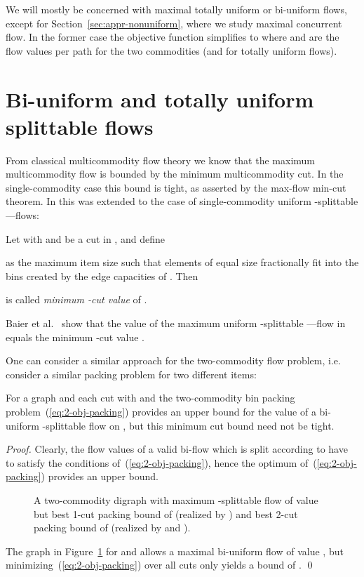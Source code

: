 We will mostly be concerned with maximal totally uniform or bi-uniform
flows, except for Section~\ref{sec:appr-nonuniform}, where we study
maximal concurrent flow. In the former case the objective function
simplifies to  where  and  are the flow
values per path for the two commodities (and  for totally uniform
flows).

\section{Bi-uniform and totally uniform splittable flows}
\label{sec:totally-uniform}

From classical multicommodity flow theory we know that the maximum
multicommodity flow is bounded by the minimum multicommodity cut. In
the single-commodity case this bound is tight, as asserted by the
max-flow min-cut theorem. In \cite{baier-koehler-skutella:05} this was
extended to the case of single-commodity uniform -splittable
---flows:
\begin{definition}
  Let  with  and  be a cut in
  , and define 
  
  as the maximum item size such that  elements of equal size fractionally 
  fit into the bins created by the edge capacities of .
  Then
  
  is called \emph{minimum -cut value} of .  
\end{definition}

Baier et al.~\cite{baier-koehler-skutella:05} show that the value of the maximum
uniform -splittable ---flow in  equals the minimum -cut
value .

One can consider a similar approach for the two-commodity flow
problem, i.e. consider a similar packing problem for two different
items:


\begin{proposition}\label{prop:ck1k2-bound}
  For a graph  and each cut  with
   and  the
  two-commodity bin packing problem~(\ref{eq:2-obj-packing}) provides
  an upper bound for the value of a bi-uniform -splittable
  flow on , but this minimum cut bound need not be tight.
\end{proposition}


\begin{proof}
  Clearly, the flow values  of a valid bi-flow which is
  split according to  have to satisfy the conditions
  of~(\ref{eq:2-obj-packing}), hence the optimum
  of~(\ref{eq:2-obj-packing}) provides an upper bound.

  
  \begin{figure}
    \centering
    \caption{A two-commodity digraph with maximum -splittable
      flow of value  but best 1-cut packing bound of  (realized
      by ) and best 2-cut packing bound of  (realized by  and
      ).}
    \label{fig:packing-bound-gap}
  \end{figure}
  The graph in Figure~\ref{fig:packing-bound-gap} for  and
   allows a maximal bi-uniform flow of value , but
  minimizing~(\ref{eq:2-obj-packing}) over all cuts only yields a
  bound of .
\qed \end{proof}

